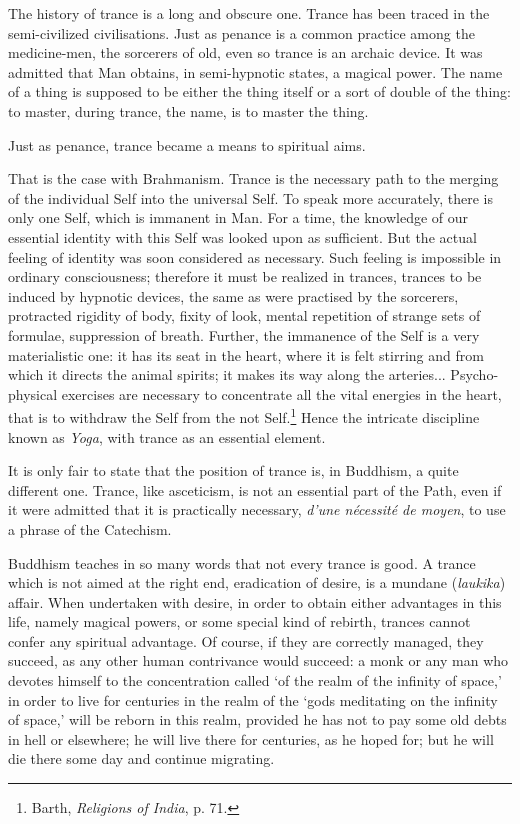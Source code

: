 \documentclass[a4paper, 11pt, oneside, english, landscape]{article}
\begin{document}
The history of trance is a long and obscure one. Trance has been traced in the semi-civilized civilisations. Just as penance is a common practice among the medicine-men, the sorcerers of old, even so trance is an archaic device. It was admitted that Man obtains, in semi-hypnotic states, a magical power. The name of a thing is supposed to be either the thing itself or a sort of double of the thing: to master, during trance, the name, is to master the thing.

Just as penance, trance became a means to spiritual aims.

That is the case with Brahmanism. Trance is the necessary path to the merging of the individual Self into the universal Self. To speak more accurately, there is only one Self, which is immanent in Man. For a time, the knowledge of our essential identity with this Self was looked upon as sufficient. But the actual feeling of identity was soon considered as necessary. Such feeling is impossible in ordinary consciousness; therefore it must be realized in trances, trances to be induced by hypnotic devices, the same as were practised by the sorcerers, protracted rigidity of body, fixity of look, mental repetition of strange sets of formulae, suppression of breath. Further, the immanence of the Self is a very materialistic one: it has its seat in the heart, where it is felt stirring and from which it directs the animal spirits; it makes its way along the arteries... Psycho-physical exercises are necessary to concentrate all the vital energies in the heart, that is to withdraw the Self from the not Self.\footnote{Barth, \emph{Religions of India}, p. 71.} Hence the intricate discipline known as \emph{Yoga}, with trance as an essential element.

It is only fair to state that the position of trance is, in Buddhism, a quite different one. Trance, like asceticism, is not an essential part of the Path, even if it were admitted that it is practically necessary, \emph{d'une nécessité de moyen}, to use a phrase of the Catechism.

Buddhism teaches in so many words that not every trance is good. A trance which is not aimed at the right end, eradication of desire, is a mundane (\emph{laukika}) affair. When undertaken with desire, in order to obtain either advantages in this life, namely magical powers, or some special kind of rebirth, trances cannot confer any spiritual advantage. Of course, if they are correctly managed, they succeed, as any other human contrivance would succeed: a monk or any man who devotes himself to the concentration called `of the realm of the infinity of space,' in order to live for centuries in the realm of the `gods meditating on the infinity of space,' will be reborn in this realm, provided he has not to pay some old debts in hell or elsewhere; he will live there for centuries, as he hoped for; but he will die there some day and continue migrating.
\end{document}
